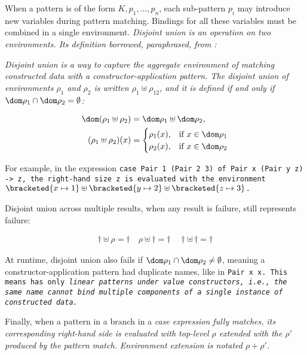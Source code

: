 \documentclass[manuscript,screen,review, 12pt, nonacm]{acmart}
\begin{document}
When a pattern is of the form $K, p_{1}, \dots, p_{n}$, each sub-pattern $p_{i}$
may introduce new variables during pattern matching. Bindings for all these
variables must be combined in a single environment. \it{Disjoint union} is an
operation on two environments. Its definition borrowed, paraphrased, from
\citet{bpc}: 

\it{Disjoint union} is a way to capture the aggregate environment of matching
constructed data with a constructor-application pattern. The disjoint union of
environments $\rho_{1}$ and $\rho_{2}$ is written $\rho_{1} \uplus \rho_{12}$,
and it is defined if and only if $\dom \rho_{1} \cap \dom \rho_{2} = \emptyset$:

\begin{align*}
  \dom(\rho_{1} \uplus \rho_{2}) &= \dom \rho_{1} \uplus \dom \rho_{2}, \\
    (\rho_{1} \uplus \rho_{2})(x) &= 
  \begin{cases}
    \rho_{1}(x), & \text{if } x \in \dom  \rho_{1} \\
    \rho_{2}(x), & \text{if } x \in \dom \rho_{2} \\
\end{cases}
\end{align*}

For example, in the \PPlus expression \tt{case Pair 1 (Pair 2 3) of Pair x (Pair
y z) -> z}, the right-hand size \tt{z} is evaluated with the environment
$\bracketed{x \mapsto 1} \uplus \bracketed{y \mapsto 2} \uplus \bracketed{z
\mapsto 3}$. 

Disjoint union across multiple results, when any result is failure, still
represents failure: 

\begin{gather*}
  \dagger \uplus \rho = \dagger \quad
  \rho \uplus \dagger = \dagger \quad
  \dagger \uplus\, \dagger = \dagger
\end{gather*}


At runtime, disjoint union also fails if  $\dom \rho_{1} \cap \dom \rho_{2} \neq
\emptyset$, meaning a constructor-application pattern had duplicate names, like
in \tt{Pair x x}. This means \PPlus has only \it{linear} patterns under value
constructors, i.e., the same name cannot bind multiple components of a single
instance of constructed data. 

Finally, when a pattern in a branch in a \it{case} expression fully matches, its
corresponding right-hand side is evaluated with top-level $\rho$ extended with
the $\rho'$ produced by the pattern match. Environment extension is notated
$\rho + \rho'$. 
\end{document}
